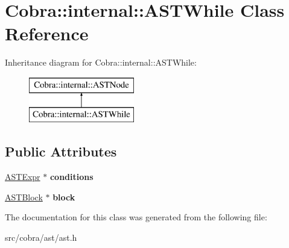 \hypertarget{class_cobra_1_1internal_1_1_a_s_t_while}{\section{Cobra\+:\+:internal\+:\+:A\+S\+T\+While Class Reference}
\label{class_cobra_1_1internal_1_1_a_s_t_while}
}
Inheritance diagram for Cobra\+:\+:internal\+:\+:A\+S\+T\+While\+:\begin{figure}[H]
\begin{center}
\leavevmode
\includegraphics[height=2.000000cm]{class_cobra_1_1internal_1_1_a_s_t_while}
\end{center}
\end{figure}
\subsection*{Public Attributes}
\begin{DoxyCompactItemize}
\item 
\hypertarget{class_cobra_1_1internal_1_1_a_s_t_while_a8a97bd833a835abb8238263baa3f559b}{\hyperlink{class_cobra_1_1internal_1_1_a_s_t_expr}{A\+S\+T\+Expr} $\ast$ {\bfseries conditions}}\label{class_cobra_1_1internal_1_1_a_s_t_while_a8a97bd833a835abb8238263baa3f559b}

\item 
\hypertarget{class_cobra_1_1internal_1_1_a_s_t_while_a625f9bfdcd435fc72a6bf54cbac8984f}{\hyperlink{class_cobra_1_1internal_1_1_a_s_t_block}{A\+S\+T\+Block} $\ast$ {\bfseries block}}\label{class_cobra_1_1internal_1_1_a_s_t_while_a625f9bfdcd435fc72a6bf54cbac8984f}

\end{DoxyCompactItemize}


The documentation for this class was generated from the following file\+:\begin{DoxyCompactItemize}
\item 
src/cobra/ast/ast.\+h\end{DoxyCompactItemize}
